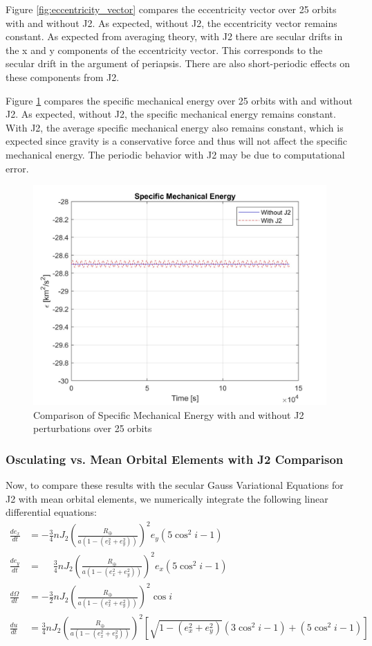 Figure \ref{fig:eccentricity_vector} compares the eccentricity vector over 25 orbits with and without J2. As expected, without J2, the eccentricity vector remains constant. As expected from averaging theory, with J2 there are secular drifts in the x and y components of the eccentricity vector. This corresponds to the secular drift in the argument of periapsis. There are also short-periodic effects on these components from J2.  


Figure \ref{fig:specific_energy} compares the specific mechanical energy over 25 orbits with and without J2. As expected, without J2, the specific mechanical energy remains constant. With J2, the average specific mechanical energy also remains constant, which is expected since gravity is a conservative force and thus will not affect the specific mechanical energy. The periodic behavior with J2 may be due to computational error. 

\begin{figure}[H]
    \centering
    \includegraphics[width=0.5\linewidth]{PS1/Figures/Epsilon_J2_Comparison.jpg}
    \caption{Comparison of Specific Mechanical Energy with and without J2 perturbations over 25 orbits}
    \label{fig:specific_energy}
\end{figure}

\subsubsection{Osculating vs. Mean Orbital Elements with J2 Comparison}
Now, to compare these results with the secular Gauss Variational Equations for J2 with mean orbital elements, we numerically integrate the following linear differential equations:
\begin{align}
\frac{d e_x}{dt} &= -\frac{3}{4} n J_2 \left( \frac{R_\oplus}{a \left(1 - (e_x^2 + e_y^2)\right)} \right)^2 e_y (5 \cos^2 i - 1) \\
\frac{d e_y}{dt} &= \phantom{-}\frac{3}{4} n J_2 \left( \frac{R_\oplus}{a \left(1 - (e_x^2 + e_y^2)\right)} \right)^2 e_x (5 \cos^2 i - 1) \\
\frac{d\Omega}{dt} &= -\frac{3}{2} n J_2 \left( \frac{R_\oplus}{a \left(1 - (e_x^2 + e_y^2)\right)} \right)^2 \cos i  \\
\frac{du}{dt} &= \frac{3}{4} n J_2 \left( \frac{R_\oplus}{a \left(1 - (e_x^2 + e_y^2)\right)} \right)^2 
\left[ \sqrt{1 - (e_x^2 + e_y^2)} (3 \cos^2 i - 1) + (5 \cos^2 i - 1) \right] \quad 
\end{align}

